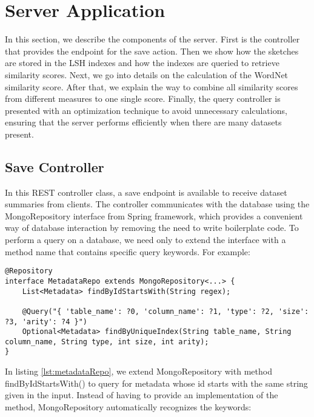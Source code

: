 \section{Server Application}

In this section, we describe the components of the server. First is the controller that provides the endpoint for the save action. Then we show how the sketches are stored in the LSH indexes and how the indexes are queried to retrieve similarity scores. Next, we go into details on the calculation of the WordNet similarity score. After that, we explain the way to combine all similarity scores from different measures to one single score. Finally, the query controller is presented with an optimization technique to avoid unnecessary calculations, ensuring that the server performs efficiently when there are many datasets present.

\subsection{Save Controller}\label{saveController}

In this REST controller class, a save endpoint is available to receive dataset summaries from clients. The controller communicates with the database using the MongoRepository interface from Spring framework, which provides a convenient way of database interaction by removing the need to write boilerplate code. To perform a query on a database, we need only to extend the interface with a method name that contains specific query keywords. For example:

\begin{lstlisting}[caption=Example of the the repository interface for collection of metadata, label=lst:metadataRepo]
@Repository
interface MetadataRepo extends MongoRepository<...> {
    List<Metadata> findByIdStartsWith(String regex);
    
    @Query("{ 'table_name': ?0, 'column_name': ?1, 'type': ?2, 'size': ?3, 'arity': ?4 }")
    Optional<Metadata> findByUniqueIndex(String table_name, String column_name, String type, int size, int arity);
}
\end{lstlisting}

In listing \ref{lst:metadataRepo}, we extend MongoRepository with method findByIdStartsWith() to query for metadata whose id starts with the same string given in the input. Instead of having to provide an implementation of the method, MongoRepository automatically recognizes the keywords:

